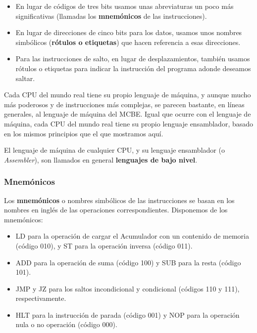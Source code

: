 \documentclass[spanish,a4paper,]{article}
\providecommand{\tightlist}{%
  \setlength{\itemsep}{0pt}\setlength{\parskip}{0pt}}
\begin{document}
\begin{itemize}
\tightlist
\item
  En lugar de códigos de tres bits usamos unas abreviaturas un poco más
  significativas (llamadas los \textbf{mnemónicos} de las
  instrucciones).
\item
  En lugar de direcciones de cinco bits para los datos, usamos unos
  nombres simbólicos (\textbf{rótulos o etiquetas}) que hacen referencia
  a esas direcciones.
\item
  Para las instrucciones de salto, en lugar de desplazamientos, también
  usamos rótulos o etiquetas para indicar la instrucción del programa
  adonde deseamos saltar.
\end{itemize}

Cada CPU del mundo real tiene su propio lenguaje de máquina, y aunque
mucho más poderosos y de instrucciones más complejas, se parecen
bastante, en líneas generales, al lenguaje de máquina del MCBE. Igual
que ocurre con el lenguaje de máquina, cada CPU del mundo real tiene su
propio lenguaje ensamblador, basado en los mismos principios que el que
mostramos aquí.

El lenguaje de máquina de cualquier CPU, y su lenguaje ensamblador (o
\emph{Assembler}), son llamados en general \textbf{lenguajes de bajo
nivel}.

\hypertarget{mnemuxf3nicos}{%
\subsubsection{Mnemónicos}\label{mnemuxf3nicos}}

Los \textbf{mnemónicos} o nombres simbólicos de las instrucciones se
basan en los nombres en inglés de las operaciones correspondientes.
Disponemos de los mnemónicos:

\begin{itemize}
\tightlist
\item
  LD para la operación de cargar el Acumulador con un contenido de
  memoria (código 010), y ST para la operación inversa (código 011).
\item
  ADD para la operación de suma (código 100) y SUB para la resta (código
  101).
\item
  JMP y JZ para los saltos incondicional y condicional (códigos 110 y
  111), respectivamente.
\item
  HLT para la instrucción de parada (código 001) y NOP para la operación
  nula o no operación (código 000).
\end{itemize}
\end{document}
